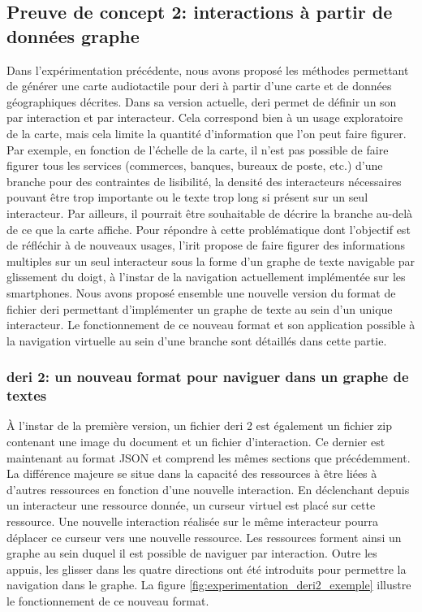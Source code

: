 \subsection{Preuve de concept 2: interactions à partir de données graphe}

\label{sec:experimentation_poc2}


Dans l'expérimentation précédente, nous avons proposé les méthodes permettant de générer une carte audiotactile pour \gls{deri} à partir d'une carte et de données géographiques décrites. Dans sa version actuelle, \gls{deri} permet de définir un son par interaction et par interacteur. Cela correspond bien à un usage exploratoire de la carte, mais cela limite la quantité d'information que l'on peut faire figurer. Par exemple, en fonction de l'échelle de la carte, il n'est pas possible de faire figurer tous les services (commerces, banques, bureaux de poste, etc.) d'une branche pour des contraintes de lisibilité, la densité des interacteurs nécessaires pouvant être trop importante ou le texte trop long si présent sur un seul interacteur. Par ailleurs, il pourrait être souhaitable de décrire la branche au-delà de ce que la carte affiche. Pour répondre à cette problématique dont l'objectif est de réfléchir à de nouveaux usages, l'\gls{irit} propose de faire figurer des informations multiples sur un seul interacteur sous la forme d'un graphe de texte navigable par glissement du doigt, à l'instar de la navigation actuellement implémentée sur les smartphones. Nous avons proposé ensemble une nouvelle version du format de fichier \gls{deri} permettant d'implémenter un graphe de texte au sein d'un unique interacteur. Le fonctionnement de ce nouveau format et son application possible à la navigation virtuelle au sein d'une branche sont détaillés dans cette partie.

\subsubsection{\gls{deri} 2: un nouveau format pour naviguer dans un graphe de textes}

À l'instar de la première version, un fichier \gls{deri} 2 est également un fichier zip contenant une image du document et un fichier d'interaction. Ce dernier est maintenant au format JSON et comprend les mêmes sections que précédemment. La différence majeure se situe dans la capacité des ressources à être liées à d'autres ressources en fonction d'une nouvelle interaction. En déclenchant depuis un interacteur une ressource donnée, un curseur virtuel est placé sur cette ressource. Une nouvelle interaction réalisée sur le même interacteur pourra déplacer ce curseur vers une nouvelle ressource. Les ressources forment ainsi un graphe au sein duquel il est possible de naviguer par interaction. Outre les appuis, les glisser dans les quatre directions ont été introduits pour permettre la navigation dans le graphe. La figure \ref{fig:experimentation_deri2_exemple} illustre le fonctionnement de ce nouveau format.


